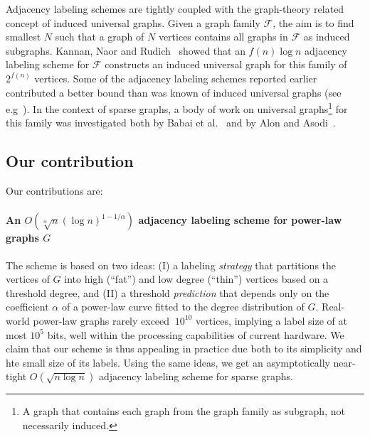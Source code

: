 Adjacency labeling schemes are tightly coupled with  the graph-theory related concept of induced universal graphs.
Given a  graph family  $\mathcal{F}$, the aim  is to find smallest $N$ such that a graph of  $N$ vertices contains all graphs in $\mathcal{F}$ as induced subgraphs. 
Kannan, Naor and Rudich~\cite{Kannan92} showed that an $f(n) \log n$ adjacency labeling scheme for $\mathcal{F}$  constructs an induced universal graph for this family of  $2^{f(n)}$ vertices. Some  of the adjacency labeling schemes reported earlier  contributed a better bound than was known of  induced universal graphs (see e.g~\cite{BCLR,Alstrup02}).
In the context of  sparse graphs,  a body of work on universal graphs\footnote{A graph that  contains each graph from the graph family as subgraph, not necessarily induced.} for this family was  investigated both by  Babai et al.~\cite{babai1982graphs} and  by Alon and Asodi~\cite{Alon2002universal}. 

\subsection{Our contribution}

Our contributions are:

\paragraph{An  $O(\sqrt[\alpha] n (\log n)^{1 - 1/\alpha})$ adjacency labeling scheme for power-law graphs $G$}
The scheme is based on two ideas:
(I) a labeling \emph{strategy} that  partitions the vertices of $G$ into high (``fat'') and low degree (``thin'') vertices based on a threshold degree, and (II) a threshold \emph{prediction} that depends only on the coefficient $\alpha$ of a power-law curve fitted to the degree distribution of $G$. 
Real-world power-law graphs rarely exceed  $~10^{10}$ vertices, implying a label size of at most  ${10^{5}}$ bits, well within the processing capabilities of current hardware. 
We claim that our  scheme is thus appealing in practice   due both to  its simplicity and hte small size of its labels.
Using the same ideas, we get an  asymptotically near-tight  $O(\sqrt{n \log n})$ adjacency labeling scheme for sparse graphs.

